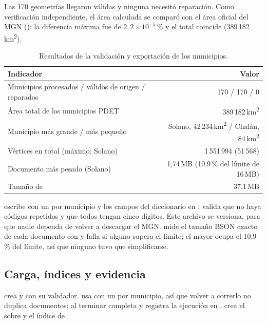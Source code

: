 Las 170 geometrías llegaron válidas y ninguna necesitó reparación. Como
verificación independiente, el área calculada se comparó con el área oficial
del MGN (): la diferencia máxima fue de
$2{,}2\times10^{-5}$\,\% y el total coincide (389\,182\,km\textsuperscript{2}).

\begin{table}[H]
  \centering\small
  \caption{Resultados de la validación y exportación de los municipios.}
  \label{tab:geometria}
  \begin{tabularx}{0.85\textwidth}{L r}
    \toprule
    Indicador & Valor \\
    \midrule
    Municipios procesados / válidos de origen / reparados & 170 / 170 / 0 \\
    Área total de los municipios PDET  & 389\,182\,km\textsuperscript{2} \\
    Municipio más grande / más pequeño & Solano, 42\,234\,km\textsuperscript{2} / Chalán, 84\,km\textsuperscript{2} \\
    Vértices en total (máximo: Solano) & 1\,551\,994 (51\,568) \\
    Documento más pesado (Solano)      & 1,74\,MB (10,9\,\% del límite de 16\,MB) \\
    Tamaño de  & 37,1\,MB \\
    \bottomrule
  \end{tabularx}
\end{table}

 escribe  con
un  por municipio y los campos del diccionario en
; valida que no haya códigos repetidos y que todos tengan
cinco dígitos. Este archivo se versiona, para que nadie dependa de volver a
descargar el MGN.  mide el tamaño BSON exacto de cada
documento con  y falla si alguno supera el límite; el
mayor ocupa el 10,9\,\% del límite, así que ninguno tuvo que simplificarse.

\subsection{Carga, índices y evidencia}
\label{sec:mgn-carga}

 crea  y  con su validador.
 usa  con un  por municipio, así que volver a correrlo no duplica documentos;
al terminar completa  y registra la ejecución
en .  crea el  sobre
 y el índice de .

